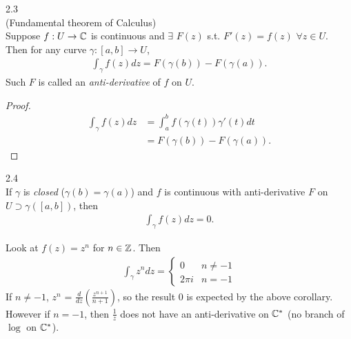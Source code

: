 \documentclass[a4paper]{article}
\begin{document}
\begin{thm} 2.3 \\(Fundamental theorem of Calculus) \\
Suppose $f:U \to \mathbb{C}$ is continuous and $\exists$ $F(z)$ s.t. $F'(z) = f(z)$ $\forall z \in U$. Then for any curve $\gamma:[a,b] \to U$,
\begin{equation*}
\begin{aligned}
\int_\gamma f(z) dz = F(\gamma(b)) - F(\gamma(a)).
\end{aligned}
\end{equation*}
Such $F$ is called an \emph{anti-derivative} of $f$ on $U$.
\end{thm}

\begin{proof}
\begin{equation*}
\begin{aligned}
\int_\gamma f(z) dz &= \int_a^b f(\gamma(t)) \gamma'(t) dt\\
&=F(\gamma(b)) - F(\gamma(a)).
\end{aligned}
\end{equation*}
\end{proof}

\begin{coro} 2.4\\
If $\gamma$ is \emph{closed} ($\gamma(b) = \gamma(a)$) and $f$ is continuous with anti-derivative $F$ on $U \supset \gamma([a,b])$, then
\begin{equation*}
\begin{aligned}
\int_\gamma f(z) dz = 0.
\end{aligned}
\end{equation*}
\end{coro}

Look at $f(z) = z^n$ for $n \in \mathbb{Z}$. Then
\begin{equation*}
\begin{aligned}
\int_\gamma z^n dz = \left\{ \begin{array}{ll}
0 & n \neq -1\\
2\pi i & n = -1
\end{array}\right.
\end{aligned}
\end{equation*}
If $n \neq -1$, $z^n$ = $\frac{d}{dz}\left(\frac{z^{n+1}}{n+1}\right)$, so the result $0$ is expected by the above corollary. However if $n=-1$, then $\frac{1}{z}$ does not have an anti-derivative on $\mathbb{C}^*$ (no branch of $\log$ on $\mathbb{C}^*$).
\end{document}
